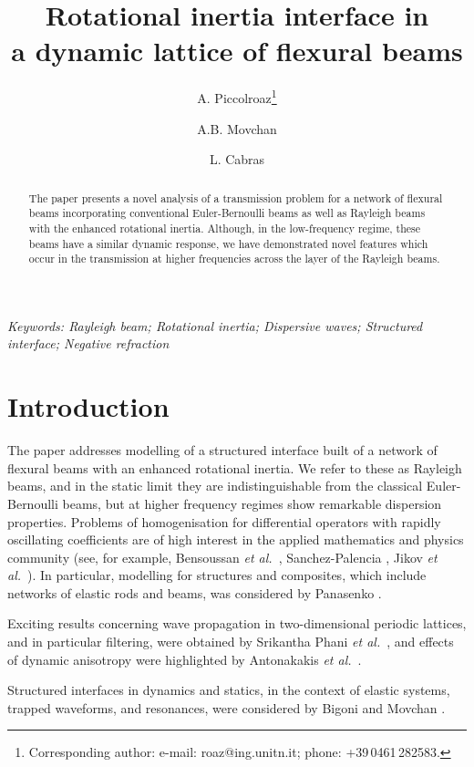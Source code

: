 \documentclass[11pt]{article}
\title{Rotational inertia interface in \\ a dynamic lattice of flexural beams}
\author[1]{A. Piccolroaz\footnote{Corresponding author: e-mail: roaz@ing.unitn.it; phone: +39\,0461\,282583.}}
\author[2]{A.B. Movchan}
\author[1]{L. Cabras}
\affil[1]{Dipartimento di Ingegneria Meccanica e Strutturale, Universit\`a di Trento, Italy}
\affil[2]{Department of Mathematical Sciences, University of Liverpool, U.K.}
\date{}
\begin{document}
\maketitle

\begin{abstract}
\noindent
The paper presents a novel analysis of a transmission problem for a network of flexural beams incorporating conventional Euler-Bernoulli beams as well as Rayleigh beams with the enhanced rotational inertia.
Although, in the low-frequency regime, these beams have a similar dynamic response, we have demonstrated novel features which occur in the transmission at higher frequencies across the layer of the Rayleigh beams.

\end{abstract}

{\it Keywords: Rayleigh beam; Rotational inertia; Dispersive waves; Structured interface; Negative refraction}




\section{Introduction}
\label{sec01}

The paper addresses modelling of a structured interface built of a network of flexural beams with an enhanced rotational inertia. We refer to these as Rayleigh beams, and in the static limit they are indistinguishable from the classical Euler-Bernoulli beams, but at higher frequency regimes show remarkable dispersion properties.
Problems of homogenisation for differential operators with rapidly oscillating coefficients are of high interest in the applied mathematics and physics community (see, for example, Bensoussan {\em et al.}~\cite{BLP1978}, Sanchez-Palencia \cite{SP1980}, Jikov {\em et al.}~\cite{Jikov1994}). In particular, modelling for structures and composites, which include networks of elastic rods and beams, was considered by Panasenko \cite{Panasenko2005}.

Exciting results concerning wave propagation in two-dimensional periodic lattices, and in particular filtering, were obtained by Srikantha Phani {\em et al.}~\cite{Fleck2006}, and effects of dynamic anisotropy were highlighted by Antonakakis {\em et al.}~\cite{Craster_2014}.

Structured interfaces in dynamics and statics, in the context of elastic systems, trapped waveforms, and resonances, were considered by Bigoni and Movchan \cite{Bigoni_2002}.
\end{document}
